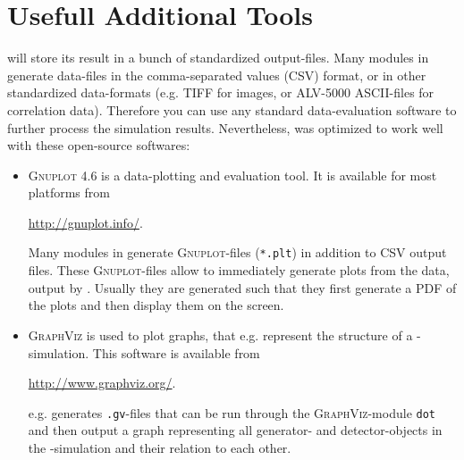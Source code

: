 \section{Usefull Additional Tools}
\label{sec:UsefullAdditionalTools}
\df will store its result in a bunch of standardized output-files. Many modules in \df generate data-files in the comma-separated values (CSV) format, or in other standardized data-formats (e.g. TIFF for images, or ALV-5000 ASCII-files for correlation data). Therefore you can use any standard data-evaluation software to further process the simulation results. Nevertheless, \df was optimized to work well with these open-source softwares:
\begin{itemize}
	\item \textsc{Gnuplot 4.6} is a data-plotting and evaluation tool. It is available for most platforms from 
					\begin{center}
						\url{http://gnuplot.info/}.
					\end{center}
				Many modules in \df generate \textsc{Gnuplot}-files (\texttt{*.plt}) in addition to CSV output files. These \textsc{Gnuplot}-files allow to immediately generate plots from the data, output by \df. Usually they are generated such that they first generate a PDF of the plots and then display them on the screen.
	\item \textsc{GraphViz} is used to plot graphs, that e.g. represent the structure of a \df-simulation. This software is available from
						\begin{center}
						\url{http://www.graphviz.org/}.
					\end{center}
     \df e.g. generates \texttt{.gv}-files that can be run through the \textsc{GraphViz}-module \texttt{dot} and then output a graph representing all generator- and detector-objects in the \df-simulation and their relation to each other.
\end{itemize}
